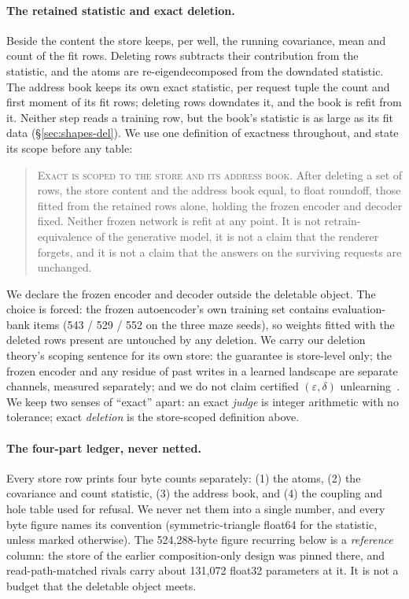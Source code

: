 \documentclass{article} %
\begin{document}
\paragraph{The retained statistic and exact deletion.} Beside the content the store keeps, per
well, the running covariance, mean and count of the fit rows. Deleting rows subtracts their
contribution from the statistic, and the atoms are re-eigendecomposed from the downdated
statistic. The address book keeps its own exact statistic, per request tuple the count and first
moment of its fit rows; deleting rows downdates it, and the book is refit from it. Neither step
reads a training row, but the book's statistic is as large as its fit data
(\S\ref{sec:shapes-del}). We use one definition of exactness throughout, and state its scope
before any table:

\begin{quote}\small
\textsc{Exact is scoped to the store and its address book.} After deleting a set of rows, the store
content and the address book equal, to float roundoff, those fitted from the retained rows alone,
holding the frozen encoder and decoder fixed. Neither frozen network is refit at any point. It is
not retrain-equivalence of the generative model, it is not a claim that the renderer forgets, and it
is not a claim that the answers on the surviving requests are unchanged.
\end{quote}

\noindent We declare the frozen encoder and decoder outside the deletable object. The choice
is forced: the frozen autoencoder's own training set contains evaluation-bank items
(543 / 529 / 552 on the three maze seeds), so weights fitted with the deleted rows present are untouched by any deletion. %
We carry our deletion theory's scoping sentence for its own store: the guarantee
is store-level only; the frozen encoder and any residue of past writes in a learned
landscape are separate channels, measured separately; and we do not claim certified
$(\varepsilon,\delta)$ unlearning~\citep{guo2020certified}. %
We keep two senses of ``exact'' apart: an exact \emph{judge} is integer arithmetic with no
tolerance; exact \emph{deletion} is the store-scoped definition above.

\paragraph{The four-part ledger, never netted.} Every store row prints four byte counts
separately: (1) the atoms, (2) the covariance and count statistic, (3) the address book, and
(4) the coupling and hole table used for refusal.
We never net them into a single number, and every byte figure names its convention
(symmetric-triangle float64 for the statistic, unless marked otherwise). The 524,288-byte figure
recurring below is a \emph{reference} column: the store of the earlier composition-only design
was pinned there, and read-path-matched rivals carry about 131,072 float32 parameters at it. %
It is not a budget that the deletable object meets.
\end{document}
